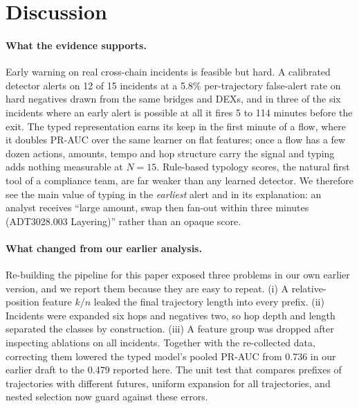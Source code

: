 \section{Discussion}
\label{sec:discussion}

\paragraph{What the evidence supports.}
Early warning on real cross-chain incidents is feasible but hard.
A calibrated detector alerts on 12 of 15 incidents at a 5.8\% per-trajectory false-alert rate on hard negatives drawn from the same bridges and DEXs, and in three of the six incidents where an early alert is possible at all it fires 5 to 114 minutes before the exit.
The typed representation earns its keep in the first minute of a flow, where it doubles PR-AUC over the same learner on flat features; once a flow has a few dozen actions, amounts, tempo and hop structure carry the signal and typing adds nothing measurable at $N=15$.
Rule-based typology scores, the natural first tool of a compliance team, are far weaker than any learned detector.
We therefore see the main value of typing in the \emph{earliest} alert and in its explanation: an analyst receives ``large amount, swap then fan-out within three minutes (ADT3028.003 Layering)'' rather than an opaque score.

\paragraph{What changed from our earlier analysis.}
Re-building the pipeline for this paper exposed three problems in our own earlier version, and we report them because they are easy to repeat.
(i) A relative-position feature $k/n$ leaked the final trajectory length into every prefix.
(ii) Incidents were expanded six hops and negatives two, so hop depth and length separated the classes by construction.
(iii) A feature group was dropped after inspecting ablations on all incidents.
Together with the re-collected data, correcting them lowered the typed model's pooled PR-AUC from 0.736 in our earlier draft to the 0.479 reported here.
The unit test that compares prefixes of trajectories with different futures, uniform expansion for all trajectories, and nested selection now guard against these errors.

